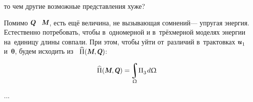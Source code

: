 \begin{otherlanguage}{russian}
\vspace{-0.2em}\noindent
то чем другие возможные представления хуже?

Помимо $\internalforce$ ~$\internalmoment$, есть ещё величина, не вызывающая сомнений\:--- упругая энергия.
Естественно потребовать, чтобы в~одно\-мерной и в~трёх\-мерной моделях энергии на~единицу длины совпали.
При этом, чтобы уйти от~различий в~трактовках ${\bm{u}_{\raisemath{-0.2ex}{1}}}$ и~$\bm{\theta}$, будем исходить из ~${\widehat{\potential}(\internalmoment, \internalforce)}$:

\nopagebreak\vspace{-0.1em}\begin{equation*}
\widehat{\potential}(\internalmoment, \internalforce) = \hspace{-0.2ex} \integral\displaylimits_{\rodsection} \hspace{-0.4ex} \potential_{\raisemath{-0.2ex}{3}} \hspace{.2ex} d\rodsection
\end{equation*}

...



\end{otherlanguage}



\label{para:variationalmethodforonedimension}

